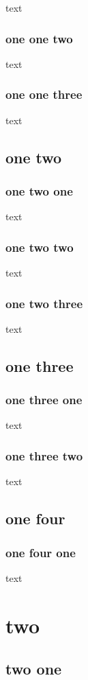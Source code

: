\documentclass{book}
\begin{document}
text

\subsection{one one two}

text

\subsection{one one three}

text

\section{one two}

\localtableofcontents

\subsection{one two one}

text

\subsection{one two two}
text

\subsection{one two three}
text

\section{one three}

\subsection{one three one}

text

\subsection{one three two}

text

\section{one four}

\subsection{one four one}

text

\chapter{two}

\section{two one}
\end{document}
